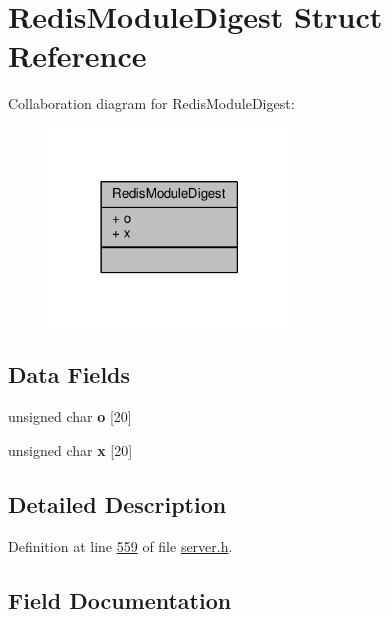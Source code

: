 \hypertarget{structRedisModuleDigest}{}\section{Redis\+Module\+Digest Struct Reference}
\label{structRedisModuleDigest}


Collaboration diagram for Redis\+Module\+Digest\+:\nopagebreak
\begin{figure}[H]
\begin{center}
\leavevmode
\includegraphics[width=182pt]{structRedisModuleDigest__coll__graph}
\end{center}
\end{figure}
\subsection*{Data Fields}
\begin{DoxyCompactItemize}
\item 
\mbox{\label{structRedisModuleDigest_a7e676a54b86ba21002470323de056455}} 
unsigned char {\bfseries o} \mbox{[}20\mbox{]}
\item 
\mbox{\label{structRedisModuleDigest_a1ccfc1f6709218f9bbeacd8b0d2dbd5e}} 
unsigned char {\bfseries x} \mbox{[}20\mbox{]}
\end{DoxyCompactItemize}


\subsection{Detailed Description}


Definition at line \hyperlink{server_8h_source_l00559}{559} of file \hyperlink{server_8h_source}{server.\+h}.



\subsection{Field Documentation}
\mbox{\label{structRedisModuleDigest_a7e676a54b86ba21002470323de056455}} 
